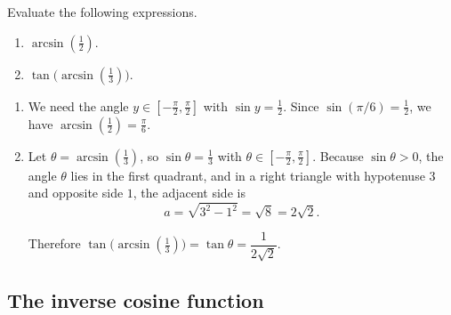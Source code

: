 \begin{workedexample}
\begin{example}
Evaluate the following expressions.
\begin{enumerate}
    \item \(\arcsin\!\left(\tfrac{1}{2}\right)\).
    \item \(\tan\!\bigl(\arcsin\!\left(\tfrac{1}{3}\right)\bigr)\).
\end{enumerate}
\end{example}

\begin{solution}
\solutionbreak
\begin{enumerate}
    \item We need the angle \(y \in \left[-\tfrac{\pi}{2}, \tfrac{\pi}{2}\right]\) with \(\sin y = \tfrac{1}{2}\). Since \(\sin(\pi/6) = \tfrac{1}{2}\), we have \(\arcsin\!\left(\tfrac{1}{2}\right) = \tfrac{\pi}{6}\).

    \item Let \(\theta = \arcsin\!\left(\tfrac{1}{3}\right)\), so \(\sin\theta = \tfrac{1}{3}\) with \(\theta \in \left[-\tfrac{\pi}{2}, \tfrac{\pi}{2}\right]\). Because \(\sin\theta > 0\), the angle \(\theta\) lies in the first quadrant, and in a right triangle with hypotenuse \(3\) and opposite side \(1\), the adjacent side is
    \[
    a = \sqrt{3^{2} - 1^{2}} = \sqrt{8} = 2\sqrt{2}.
    \]

    \begin{center}
    \end{center}

    Therefore \(\tan\!\bigl(\arcsin\!\left(\tfrac{1}{3}\right)\bigr) = \tan\theta = \dfrac{1}{2\sqrt{2}}\).
\end{enumerate}
\end{solution}
\end{workedexample}

\subsection{The inverse cosine function}

